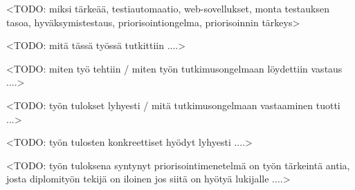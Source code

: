 <TODO: miksi tärkeää, testiautomaatio,  web-sovellukset,  monta testauksen tasoa, hyväksymistestaus, priorisointiongelma, priorisoinnin tärkeys>

<TODO: mitä tässä työssä tutkittiin ....>

<TODO: miten työ tehtiin / miten työn tutkimusongelmaan löydettiin vastaus ....>

<TODO: työn tulokset lyhyesti / mitä tutkimusongelmaan vastaaminen tuotti ...>

<TODO: työn tulosten konkreettiset hyödyt lyhyesti ....>

<TODO: työn tuloksena syntynyt priorisointimenetelmä on työn tärkeintä antia, josta diplomityön tekijä on iloinen jos siitä on hyötyä lukijalle ....>